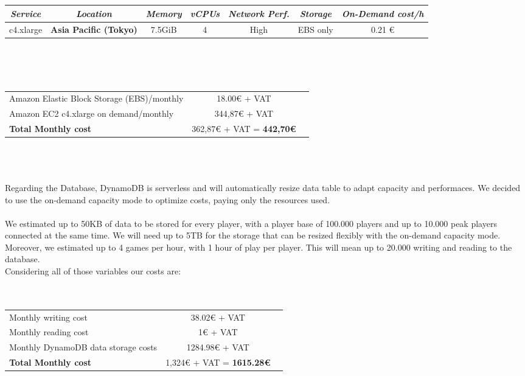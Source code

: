 \\\\\\
\\
\begin{tabular}{|c|c|c|c|c|c|c|}
\hline
\textit{Service} & \textit{Location} & \textit{Memory} & \textit{vCPUs} & \textit{Network Perf.} & \textit{Storage} & \textit{On-Demand cost/h}\\
\hline
c4.xlarge &	\textbf{Asia Pacific (Tokyo)} & 7.5GiB &	4 &	High & EBS only & 0.21 €\\
\hline
\end{tabular}
\\\\\\
\begin{tabular}{lcr}
Amazon Elastic Block Storage (EBS)/monthly  & 18.00€ + VAT \\
Amazon EC2 c4.xlarge on demand/monthly & 344,87€ + VAT \\
\hline
\textbf{Total Monthly cost} & 362,87€ + VAT = \textbf{442,70€}
\end{tabular}
\\\\\\
Regarding the Database, DynamoDB is serverless and will automatically resize data table to adapt capacity and performaces. We decided to use the on-demand capacity mode to optimize costs, paying only the resources used.\\
\\
We estimated up to 50KB of data to be stored for every player, with a player base of 100.000 players and up to 10.000 peak players connected at the same time. We will need up to 5TB for the storage that can be resized flexibly with the on-demand capacity mode.\\
Moreover, we estimated up to 4 games per hour, with 1 hour of play per player. This will mean up to 20.000 writing and reading to the database.\\
Considering all of those variables our costs are:\\\\\\
\begin{tabular}{lcr}
Monthly writing cost & 38.02€ + VAT \\
Monthly reading cost & 1€ + VAT \\
Monthly DynamoDB data storage costs & 1284.98€ + VAT \\
\hline
\textbf{Total Monthly cost} & 1,324€ + VAT = \textbf{1615.28€}
\end{tabular}
\\\\

